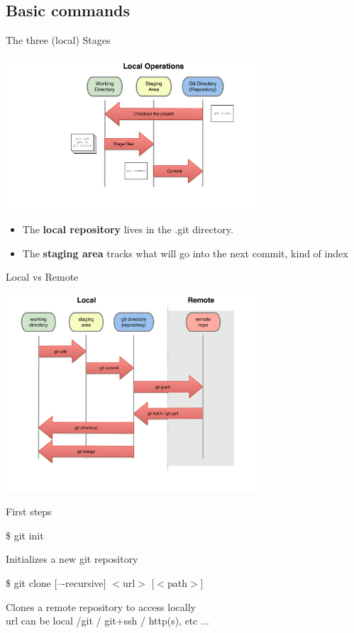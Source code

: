 \documentclass[10pt,xcolor=dvipsnames]{beamer}
\begin{document}
\subsection{Basic commands}

\begin{frame}{The three (local) Stages}
\begin{center}
\includegraphics[width = 0.7\textwidth]{three_states.pdf}
\end{center}
\begin{itemize}
\item The {\bf local repository} lives in the .git directory.
\item The {\bf staging area} tracks what will go into the next commit, kind of index
\end{itemize}
\end{frame}

\begin{frame}{Local vs Remote}
\begin{center}
\includegraphics[width = 0.7\textwidth]{diagrams-lifecycle_remote.pdf}
\end{center}
\end{frame}


\begin{frame}{First steps}
\begin{block}{}
\$ git init
\end{block}
Initializes a new git repository\\[0.4in]

\begin{block}{}
\$ git clone [–-recursive] $<$url$>$ [$<$path$>$]
\end{block}
Clones a remote repository to access locally\\
url can be local /git / git+ssh / http(s), etc ...
\end{frame}
\end{document}

